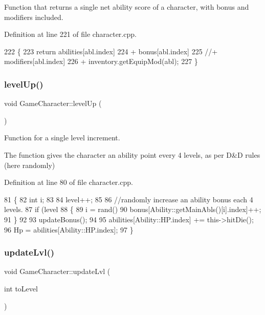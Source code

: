 Function that returns a single net ability score of a character, with bonus and modifiers included. 

Definition at line 221 of file character.\+cpp.


\begin{DoxyCode}
222 \{
223     \textcolor{keywordflow}{return} abilities[abl.index]
224         + bonus[abl.index]
225         \textcolor{comment}{//+ modifiers[abl.index]}
226         + inventory.getEquipMod(abl);
227 \}
\end{DoxyCode}
\hypertarget{class_game_character_a367a537148a995677d9649b975cb326b}{}\label{class_game_character_a367a537148a995677d9649b975cb326b} 
\subsubsection{\texorpdfstring{level\+Up()}{levelUp()}}
{\footnotesize\ttfamily void Game\+Character\+::level\+Up (\begin{DoxyParamCaption}{ }\end{DoxyParamCaption})}



Function for a single level increment. 

The function gives the character an ability point every 4 levels, as per D\&D rules (here randomly) 

Definition at line 80 of file character.\+cpp.


\begin{DoxyCode}
81 \{
82     \textcolor{keywordtype}{int} i;
83 
84     level++;
85 
86     \textcolor{comment}{//randomly increase an ability bonus each 4 levels.}
87     \textcolor{keywordflow}{if} (level %
88     \{
89         i = rand() %
90         bonus[Ability::getMainAbls()[i].index]++;
91     \}
92 
93     updateBonus();
94 
95     abilities[Ability::HP.index] += this->hitDie();
96     Hp = abilities[Ability::HP.index];
97 \}
\end{DoxyCode}
\hypertarget{class_game_character_a0e6839e7c79e97ba7daea9ed0fc2569e}{}\label{class_game_character_a0e6839e7c79e97ba7daea9ed0fc2569e} 
\subsubsection{\texorpdfstring{update\+Lvl()}{updateLvl()}}
{\footnotesize\ttfamily void Game\+Character\+::update\+Lvl (\begin{DoxyParamCaption}\item[{int}]{to\+Level }\end{DoxyParamCaption})\hspace{0.3cm}{\ttfamily [virtual]}}



